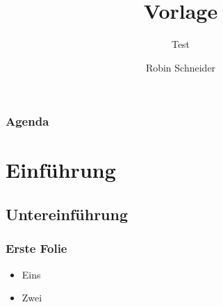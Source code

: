 \documentclass[
  ngerman,
  handout
]{beamer}
\title{Vorlage}
\subtitle{Test}
\author{Robin Schneider}
\date{\formatdate{22}{06}{2015}}
\begin{document}
\begin{frame}
  \titlepage%
\end{frame}

\begin{frame}
  \frametitle{Agenda}
\end{frame}

\section{Einführung}
\subsection{Untereinführung}
\begin{frame}[<+->][squeeze]
  \frametitle{Erste Folie}
  \begin{itemize}
    \item Eins
    \item Zwei
  \end{itemize}
\end{frame}

\end{document}
